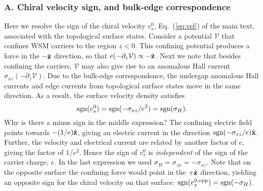 \documentclass[aps,twocolumn,prl,groupedaddress]{revtex4}
\newcommand{\be}{\begin{equation}}
\newcommand{\ee}{\end{equation}}
\renewcommand{\vec}[1]{{\bf #1}}
\begin{document}
\subsubsection{A. Chiral velocity sign, and bulk-edge correspondence}
Here we resolve the sign of the chiral velocity $v_s^0$, Eq.~(\ref{eq:vel}) of the main text, associated with the topological surface states.
Consider a potential $\mathcal{V}$ that confines WSM carriers to the region $z<0$. 
This confining potential produces a force in the $-\hat{\vec{z}}$ direction, so that $e(- \partial_z \mathcal{V}) \propto - \hat{\vec{z}} $.  
Next we note that besides confining the carriers, $\mathcal{V}$ may also give rise to an anomalous Hall current $\sigma_{xz} (-\partial_z \mathcal{V})$. 
Due to the bulk-edge correspondence, the undergap anomalous Hall currents and edge currents from topological surface states move in the same direction. 
As a result, the surface velocity density satisfies
\be
{\rm sgn}(v_s^0) = {\rm sgn} (-\sigma_{xz}/e^2) = {\rm sgn}(\sigma_H).
\label{eq:signvel}
\ee
Why is there a minus sign in the middle expression? The confining electric field points towards $-(1/e)\hat{\vec{z}}$, giving an electric current in the direction ${\rm sgn}(-\sigma_{xz}/e)\hat{\vec{x}}$. %
Further, the velocity and electrical current are related by another factor of $e$, giving the factor of $1/e^2$. 
Hence the sign of $v_s^0$ is {\it independent} of the sign of the carrier charge, $e$.
In the last expression we used $\sigma_H = \sigma_{zx} = - \sigma_{xz}$. 
Note that on the opposite surface the confining force would point in the $+\hat{\vec{z}}$ direction, yielding an opposite sign for the chiral velocity on that surface: ${\rm sgn}(v_s^{0, \rm opp}) = {\rm sgn}(-\sigma_H)$. 
\end{document}
